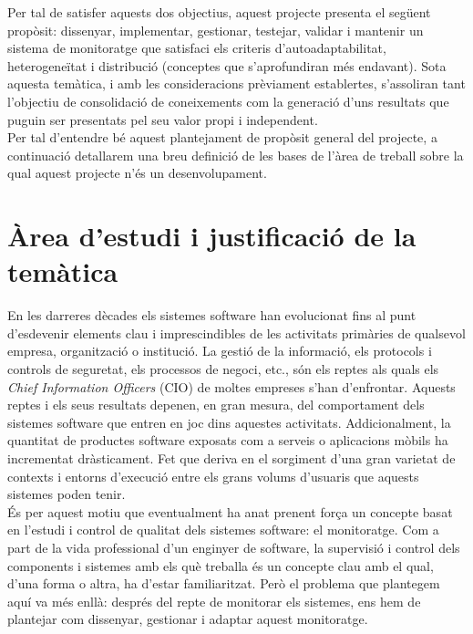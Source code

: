 Per tal de satisfer aquests dos objectius, aquest projecte presenta el següent propòsit: dissenyar, implementar, gestionar, testejar, validar i mantenir un sistema de monitoratge que satisfaci els criteris d'autoadaptabilitat, heterogeneïtat i distribució (conceptes que s'aprofundiran més endavant). Sota aquesta temàtica, i amb les consideracions prèviament establertes, s'assoliran tant l'objectiu de consolidació de coneixements com la generació d'uns resultats que puguin ser presentats pel seu valor propi i independent.\\

Per tal d'entendre bé aquest plantejament de propòsit general del projecte, a continuació detallarem una breu definició de les bases de l'àrea de treball sobre la qual aquest projecte n'és un desenvolupament.

\section{Àrea d'estudi i justificació de la temàtica}

En les darreres dècades els sistemes software han evolucionat fins al punt d'esdevenir elements clau i imprescindibles de les activitats primàries de qualsevol empresa, organització o institució. La gestió de la informació, els protocols i controls de seguretat, els processos de negoci, etc., són els reptes als quals els \textit{Chief Information Officers} (CIO) de moltes empreses s'han d'enfrontar. Aquests reptes i els seus resultats depenen, en gran mesura, del comportament dels sistemes software que entren en joc dins aquestes activitats. Addicionalment, la quantitat de productes software exposats com a serveis o aplicacions mòbils ha incrementat dràsticament. Fet que deriva en el sorgiment d'una gran varietat de contexts i entorns d'execució entre els grans volums d'usuaris que aquests sistemes poden tenir. \\

És per aquest motiu que eventualment ha anat prenent força un concepte basat en l'estudi i control de qualitat dels sistemes software: el monitoratge. Com a part de la vida professional d'un enginyer de software, la supervisió i control dels components i sistemes amb els què treballa és un concepte clau amb el qual, d'una forma o altra, ha d'estar familiaritzat. Però el problema que plantegem aquí va més enllà: després del repte de monitorar els sistemes, ens hem de plantejar com dissenyar, gestionar i adaptar aquest monitoratge.\\

